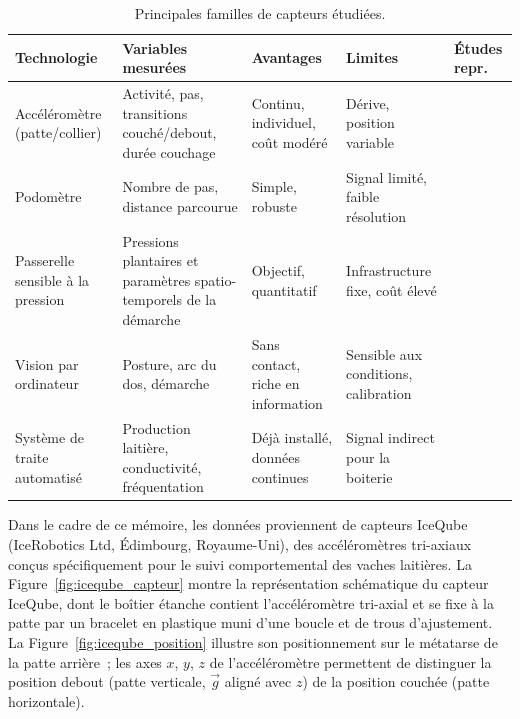 \begin{table}[H]
    \centering
    \small
    \caption{Principales familles de capteurs étudiées.}
    \label{tab:technologies_capteurs}
    \begin{tabular}{>{\raggedright\arraybackslash}p{2.4cm}
                    >{\raggedright\arraybackslash}p{2.8cm}
                    >{\raggedright\arraybackslash}p{2.8cm}
                    >{\raggedright\arraybackslash}p{2.2cm}
                    >{\raggedright\arraybackslash}p{2.2cm}}
        \toprule
        \textbf{Technologie} & \textbf{Variables mesurées} & \textbf{Avantages} &
        \textbf{Limites} & \textbf{Études repr.} \\
        \midrule
        Accéléromètre (patte/collier)
        & Activité, pas, transitions couché/debout, durée couchage
        & Continu, individuel, coût modéré
        & Dérive, position variable
        & \cite{alsaaod2012electronic,balasso2023behaviour} \\
        \addlinespace
        Podomètre
        & Nombre de pas, distance parcourue
        & Simple, robuste
        & Signal limité, faible résolution
        & \cite{flower2006effect,mazrier2006reliability} \\
        \addlinespace
        Passerelle sensible à la pression
        & Pressions plantaires et paramètres spatio-temporels de la démarche
        & Objectif, quantitatif
        & Infrastructure fixe, coût élevé
        & \cite{maertens2011gaitwise} \\
        \addlinespace
        Vision par ordinateur
        & Posture, arc du dos, démarche
        & Sans contact, riche en information
        & Sensible aux conditions, calibration
        & \cite{qiao2021review} \\
        \addlinespace
        Système de traite automatisé
        & Production laitière, conductivité, fréquentation
        & Déjà installé, données continues
        & Signal indirect pour la boiterie
        & \cite{lavrova2023lameness,vanhertem2013lameness} \\
        \bottomrule
    \end{tabular}
\end{table}

Dans le cadre de ce mémoire, les données proviennent de capteurs IceQube
(IceRobotics Ltd, Édimbourg, Royaume-Uni), des accéléromètres tri-axiaux conçus
spécifiquement pour le suivi comportemental des vaches laitières. La
Figure~\ref{fig:iceqube_capteur} montre la représentation schématique du capteur IceQube,
dont le boîtier étanche contient l'accéléromètre tri-axial et se fixe à la patte par un
bracelet en plastique muni d'une boucle et de trous d'ajustement. La
Figure~\ref{fig:iceqube_position} illustre son positionnement sur le métatarse de la patte
arrière~; les axes $x$, $y$, $z$ de l'accéléromètre permettent de distinguer la position
debout (patte verticale, $\vec{g}$ aligné avec $z$) de la position couchée (patte
horizontale).

